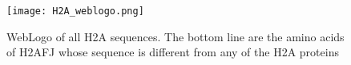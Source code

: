 \begin{figure}
  \centering
  \texttt{[image: H2A\_weblogo.png]}
  \caption{WebLogo of all H2A sequences. The bottom line are the amino acids of H2AFJ whose sequence is different from any of the H2A proteins}
  \label{fig:h2a-weblogo}
\end{figure}

